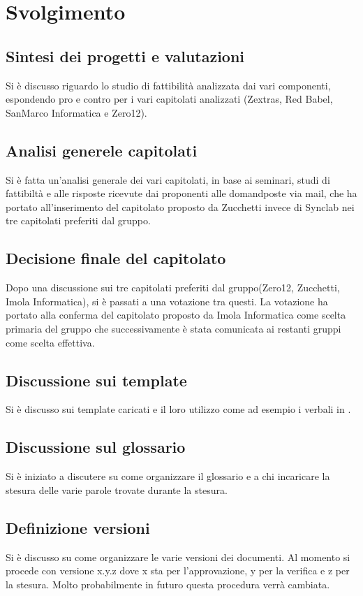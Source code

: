\section*{Svolgimento}
\subsection*{Sintesi dei progetti e valutazioni}
			Si è discusso riguardo lo studio di fattibilità analizzata dai vari componenti, espondendo pro e contro per i vari capitolati analizzati (Zextras, Red Babel, SanMarco Informatica e Zero12).

\subsection*{Analisi generele capitolati}
			Si è fatta un'analisi generale dei vari capitolati, in base ai seminari, studi di fattibiltà e alle risposte ricevute dai proponenti alle domandposte via mail, che ha portato all'inserimento del capitolato proposto da Zucchetti invece di Synclab nei tre capitolati preferiti dal gruppo. 


\subsection*{Decisione finale del capitolato}
			Dopo una discussione sui tre capitolati preferiti dal gruppo(Zero12, Zucchetti, Imola Informatica), si è passati a una votazione tra questi. La votazione ha portato alla conferma del capitolato proposto da Imola Informatica come scelta primaria del gruppo che successivamente è stata comunicata ai restanti gruppi come scelta effettiva.

\subsection*{Discussione sui template}
			Si è discusso sui template caricati e il loro utilizzo come ad esempio i verbali in \glock{\LaTeX}.


\subsection*{Discussione sul glossario}
      		Si è iniziato a discutere su come organizzare il glossario e a chi incaricare la stesura delle varie parole trovate durante la stesura.


\subsection*{Definizione versioni}
			Si è discusso su come organizzare le varie versioni dei documenti.
			Al momento si procede con versione x.y.z dove x sta per l'approvazione, y per la verifica e z per la stesura.
			Molto probabilmente in futuro questa procedura verrà cambiata.


